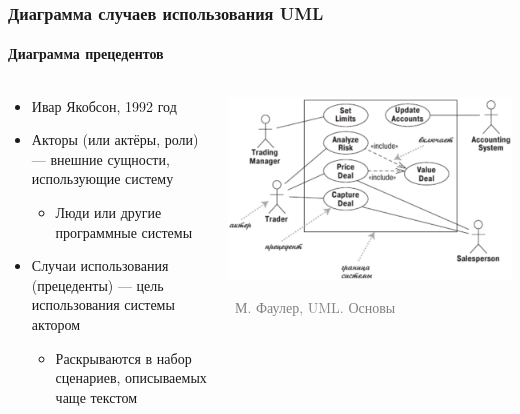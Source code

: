 \documentclass[xetex,mathserif,serif]{beamer}
\newcommand{\attribution}[1] {
	\vspace{-5mm}\begin{flushright}\begin{scriptsize}\textcolor{gray}{\textcopyright\, #1}\end{scriptsize}\end{flushright}
}
\begin{document}
	\begin{frame}
		\frametitle{Диаграмма случаев использования UML}
		\framesubtitle{Диаграмма прецедентов}
		\begin{columns}
			\begin{column}{0.5\textwidth}
				\begin{itemize}
					\item Ивар Якобсон, 1992 год
					\item Акторы (или актёры, роли) --- внешние сущности, использующие систему
					\begin{itemize}
						\item Люди или другие программные системы
					\end{itemize}
					\item Случаи использования (прецеденты)  --- цель использования системы актором
					\begin{itemize}
						\item Раскрываются в набор сценариев, описываемых чаще текстом
					\end{itemize}
				\end{itemize}
			\end{column}
			\begin{column}{0.5\textwidth}
				\begin{center}
					\includegraphics[width=\textwidth]{useCaseDiagram.png}
					\attribution{М. Фаулер, UML. Основы}
				\end{center}
			\end{column}
		\end{columns}
	\end{frame}
\end{document}
